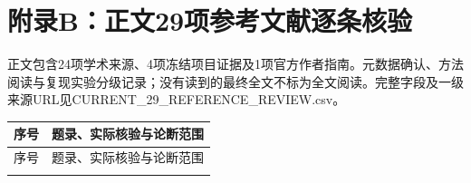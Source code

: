 \clearpage\section{附录B：正文29项参考文献逐条核验}
正文包含24项学术来源、4项冻结项目证据及1项官方作者指南。元数据确认、方法阅读与复现实验分级记录；没有读到的最终全文不标为全文阅读。完整字段及一级来源URL见CURRENT\_29\_REFERENCE\_REVIEW.csv。
\begingroup\fontsize{9}{11.5}\selectfont\setlength{\parskip}{1pt}\setlength{\parindent}{0pt}
\begin{longtable}{@{}>{\raggedright\arraybackslash}p{0.7cm}>{\raggedright\arraybackslash}p{14.8cm}@{}}
\toprule
序号 & 题录、实际核验与论断范围 \\
\midrule
\endfirsthead
\toprule
序号 & 题录、实际核验与论断范围 \\
\midrule
\endhead
\bottomrule
\endfoot


\end{longtable}

